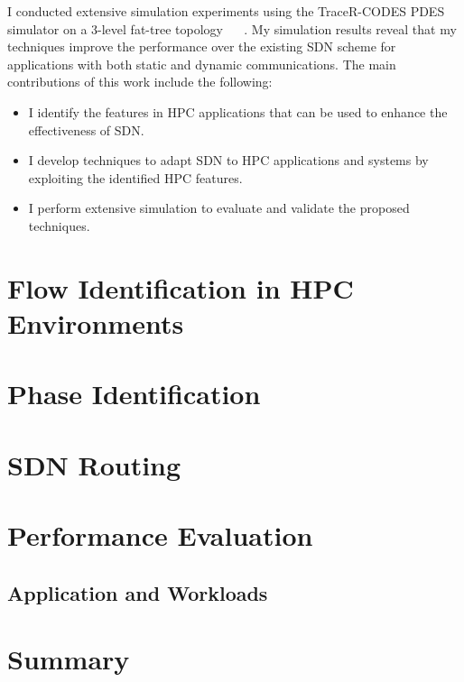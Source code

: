I conducted extensive simulation experiments using the
TraceR-CODES
\cite{jain2016evaluating,mubarak2016enabling,jain2017predicting}
PDES ~\cite{fujimoto1990parallel} simulator on a 3-level
fat-tree topology ~\cite{leiserson1985fat} ~\cite{al2008scalable}. My
simulation results reveal that my techniques improve the performance
over the existing SDN
scheme for applications with both static and dynamic communications.
The main contributions of this work include the following:
%
\begin{itemize}
\item I identify the features in HPC applications that can be used
  to enhance the effectiveness of SDN.
\item I develop techniques to adapt SDN to HPC applications and
  systems by exploiting the identified HPC features.
\item I perform extensive simulation to evaluate and validate
  the proposed techniques.
\end{itemize}


\section{Flow Identification in HPC Environments}
\label{sec:flow_identification}

\section{Phase Identification}
\label{sec:phase_identification}

\section{SDN Routing}
\label{sec:sdn_routing}

\section{Performance Evaluation}

\subsection{Application and Workloads}


\section{Summary}

